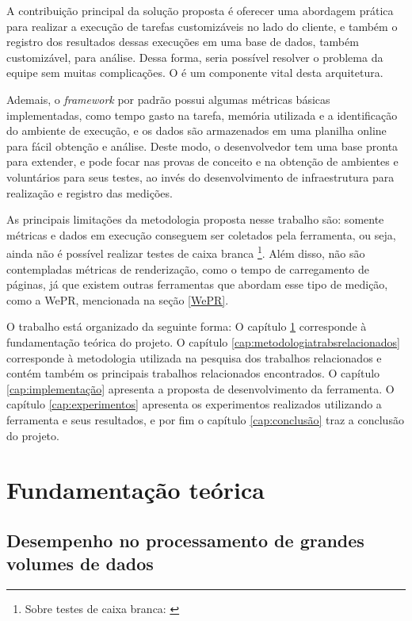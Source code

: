 \documentclass[12pt]{tcc}
\begin{document}
A contribuição principal da solução proposta é oferecer uma abordagem prática para realizar a execução de tarefas customizáveis no lado do cliente, e também o registro dos resultados dessas execuções em uma base de dados, também customizável, para análise. Dessa forma, seria possível resolver o problema da equipe sem muitas complicações. O  é um componente vital desta arquitetura.

Ademais, o \emph{framework} por padrão possui algumas métricas básicas implementadas, como tempo gasto na tarefa, memória utilizada e a identificação do ambiente de execução, e os dados são armazenados em uma planilha online para fácil obtenção e análise. Deste modo, o desenvolvedor tem uma base pronta para extender, e pode focar nas provas de conceito e na obtenção de ambientes e voluntários para seus testes, ao invés do desenvolvimento de infraestrutura para realização e registro das medições.

As principais limitações da metodologia proposta nesse trabalho são: somente métricas e dados em execução conseguem ser coletados pela ferramenta, ou seja, ainda não é possível realizar testes de caixa branca \footnote{Sobre testes de caixa branca: \citep[Capítulo 21]{Sommerville2015Software}}. Além disso, não são contempladas métricas de renderização, como o tempo de carregamento de páginas, já que existem outras ferramentas que abordam esse tipo de medição, como a WePR, mencionada na seção \ref{WePR}.

O trabalho está organizado da seguinte forma: O capítulo \ref{cap:fundamentacao_teorica} corresponde à fundamentação teórica do projeto. O capítulo \ref{cap:metodologiatrabsrelacionados} corresponde à metodologia utilizada na pesquisa dos trabalhos relacionados e contém também os principais trabalhos relacionados encontrados.
O capítulo \ref{cap:implementação} apresenta a proposta de desenvolvimento da ferramenta. O capítulo \ref{cap:experimentos} apresenta os experimentos realizados utilizando a ferramenta e seus resultados, e por fim o capítulo \ref{cap:conclusão} traz a conclusão do projeto.


\chapter{Fundamentação teórica}
\label{cap:fundamentacao_teorica}

	\section{Desempenho no processamento de grandes volumes de dados}
	\label{cap:big-data}
	
\end{document}
